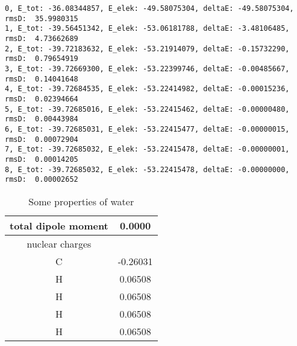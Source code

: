 \documentclass{article}
\begin{document}
 \begin{verbatim}
0, E_tot: -36.08344857, E_elek: -49.58075304, deltaE: -49.58075304, rmsD:  35.9980315
1, E_tot: -39.56451342, E_elek: -53.06181788, deltaE: -3.48106485, rmsD:  4.73662689
2, E_tot: -39.72183632, E_elek: -53.21914079, deltaE: -0.15732290, rmsD:  0.79654919
3, E_tot: -39.72669300, E_elek: -53.22399746, deltaE: -0.00485667, rmsD:  0.14041648
4, E_tot: -39.72684535, E_elek: -53.22414982, deltaE: -0.00015236, rmsD:  0.02394664
5, E_tot: -39.72685016, E_elek: -53.22415462, deltaE: -0.00000480, rmsD:  0.00443984
6, E_tot: -39.72685031, E_elek: -53.22415477, deltaE: -0.00000015, rmsD:  0.00072904
7, E_tot: -39.72685032, E_elek: -53.22415478, deltaE: -0.00000001, rmsD:  0.00014205
8, E_tot: -39.72685032, E_elek: -53.22415478, deltaE: -0.00000000, rmsD:  0.00002652
\end{verbatim}
 
 \begin{table}[ht]
    \centering
    \begin{tabular}{c|c}
         total dipole moment & 0.0000  \\
         \hline
         nuclear charges &  \\ 
         \hline
         C & -0.26031 \\
         H & 0.06508 \\
         H & 0.06508 \\
         H & 0.06508\\
         H & 0.06508 \\
    \end{tabular}
    \caption{Some properties of water}
    \label{tab:number2}
\end{table}
\end{document}

